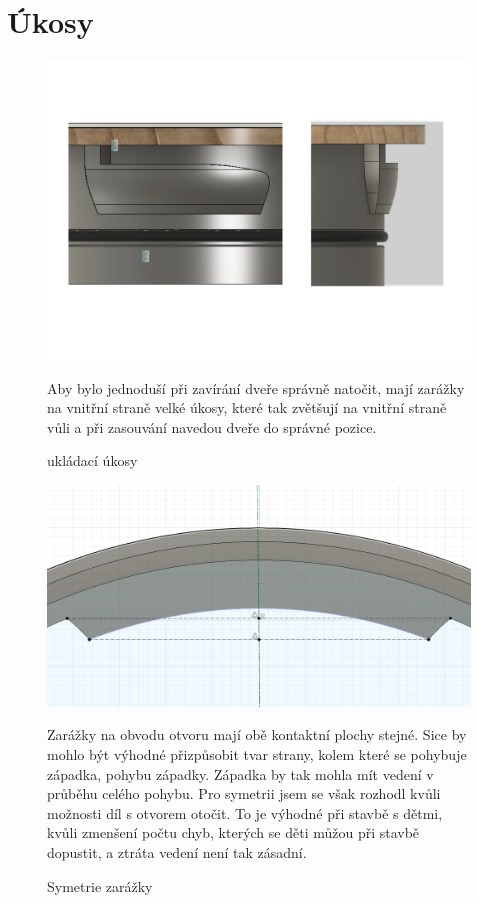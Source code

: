 {\tiny }\section{Úkosy}

\begin{figure}[htbp]  
    \centering
    \includegraphics[width=400pt]{kapitoly/obrazky/E4/ukozy/ukladaci_ukosy.pdf}
    \caption{ukládací úkosy}
    Aby bylo jednoduší při zavírání dveře správně natočit, mají zarážky na vnitřní straně velké úkosy, které tak zvětšují na vnitřní straně 
    vůli a při zasouvání navedou dveře do správné pozice.
    \label{fig:E4-ukosy}
\end{figure}

\begin{figure}[htbp]
    \centering
    \includegraphics[width=400pt]{kapitoly/obrazky/E4/ukozy/simetrie_zarazek.png}
    \caption{Symetrie zarážky}
    Zarážky na obvodu otvoru mají obě kontaktní plochy stejné. Sice by mohlo být výhodné přizpůsobit tvar strany, kolem které se pohybuje západka, 
    pohybu západky. Západka by tak mohla mít vedení v průběhu celého pohybu. Pro symetrii jsem se však rozhodl kvůli možnosti díl s otvorem otočit.
    To je výhodné při stavbě s dětmi, kvůli zmenšení počtu chyb, kterých se děti můžou při stavbě dopustit, a ztráta vedení není tak zásadní.
    \label{fig:E4-simetrie_zarazky}
\end{figure}

\clearpage
\newpage